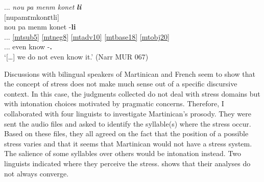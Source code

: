 \documentclass[output=paper]{langscibook}
\begin{document}
\ea\label{bkm:Ref105163197}
{...} \textit{nou pa menm konet} \textbf{\textit{li}}\\
$[$nupamɛmkonɛtli$]$\\
 nou pa menm konet -\textbf{li}\\
{...} \ref{mtsub5} \ref{mtneg8} \ref{mtadv10} \ref{mtbase18} \ref{mtobj20}\\ 
{...} \First\Pl{} \Neg{} even know -\textbf{\Third\Sg.\Obj{}}\\
\glt `[…] we do not even know it.' (Narr MUR 067)
\z

Discussions with bilingual speakers of Martinican and French seem to show that the concept of stress does not make much sense out of a specific discursive context. In this case, the judgments collected do not deal with stress domains but with intonation choices motivated by pragmatic concerns. Therefore, I collaborated with four linguists to investigate Martinican’s prosody. They were sent the audio files and asked to identify the syllable(s) where the stress occur. Based on these files, they all agreed on the fact that the position of a possible stress varies and that it seems that Martinican would not have a stress system. The salience of some syllables over others would be intonation instead. Two linguists indicated where they perceive the stress.  shows that their analyses do not always converge.
\end{document}
